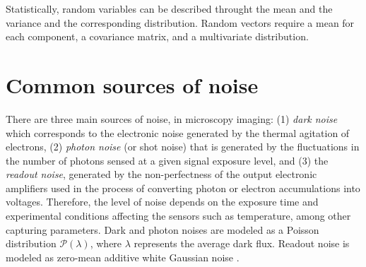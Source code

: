 \documentclass{article}
\begin{document}
Statistically, random variables can be described throught the mean and
the variance and the corresponding distribution. Random vectors
require a mean for each component, a covariance matrix, and a
multivariate distribution.

\section{Common sources of noise}

There are three main sources of noise, in microscopy imaging: (1)
\emph{dark noise} which corresponds to the electronic noise generated
by the thermal agitation of electrons, (2) \emph{photon noise} (or
shot noise) that is generated by the fluctuations in the number of
photons sensed at a given signal exposure level, and (3) the
\emph{readout noise}, generated by the non-perfectness of the output
electronic amplifiers used in the process of converting photon or
electron accumulations into voltages. Therefore, the level of noise
depends on the exposure time and experimental conditions affecting the
sensors such as temperature, among other capturing parameters. Dark
and photon noises are modeled as a Poisson distribution
$\mathcal{P}(\lambda)$, where $\lambda$ represents the average dark
flux. Readout noise is modeled as zero-mean additive white Gaussian
noise \cite{meiniel2018denoising,zhou2020wirtinger}.

\end{document}
